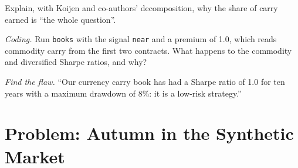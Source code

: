 \begin{exercise}[$\star\star$]\label{exo:s1:carry-across-asset-classes:6}
Explain, with Koijen and co-authors' decomposition, why the share of carry earned is ``the whole question''.
\end{exercise}

\begin{exercise}[$\star\star\star$]\label{exo:s1:carry-across-asset-classes:7}
\emph{Coding.} Run \texttt{books} with the signal \texttt{near} and a premium of 1.0, which reads commodity carry from the first two contracts. What happens to the commodity and diversified
Sharpe ratios, and why?
\end{exercise}

\begin{exercise}[$\star\star\star$]\label{exo:s1:carry-across-asset-classes:8}
\emph{Find the flaw.} ``Our currency carry book has had a Sharpe ratio of 1.0 for ten years with a maximum drawdown of 8\%: it is a low-risk strategy.''
\end{exercise}

\section{Problem: Autumn in the Synthetic Market}

